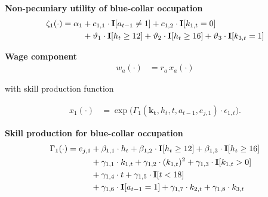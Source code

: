 \begin{frame}\textbf{Non-pecuniary utility of blue-collar occupation}\vspace{0.3cm}
%
  \begin{align*}
  \zeta_{1}(\cdot)  = \alpha_1 & + c_{1,1} \cdot {\textbf{I}}[a_{t-1} \neq 1] + c_{1,2} \cdot {\textbf{I}}[k_{1,t} = 0] \\
                              & + \vartheta_1 \cdot {\textbf{I}}[h_t \geq 12] + \vartheta_2 \cdot {\textbf{I}}[h_t \geq 16] + \vartheta_3 \cdot {\textbf{I}}[k_{3,t} = 1]
  \end{align*}
\end{frame}
\begin{frame}\textbf{Wage component}\vspace{0.3cm}
%
\begin{align*}
w_{a}(\cdot) & = r_{a} \, x_{a}(\cdot)
\end{align*}

with skill production function

\begin{align*}
x_{1}(\cdot) & = \exp \big( \Gamma_{1}(\bm{k_t},  h_t, t, a_{t-1}, e_{j,1}) \cdot \epsilon_{1,t} \big).
\end{align*}
\end{frame}
\begin{frame}\textbf{Skill production for blue-collar occupation}\vspace{0.3cm}
%
\begin{align*}
     \Gamma_1(\cdot) = e_{j,1} & + \beta_{1,1} \cdot h_t + \beta_{1, 2} \cdot {\textbf{I}}[h_t \geq 12] + \beta_{1,3} \cdot {\textbf{I}}[h_t\geq 16]\\
                                   & + \gamma_{1, 1} \cdot  k_{1,t} + \gamma_{1,2} \cdot  (k_{1,t})^2 + \gamma_{1,3} \cdot  {\textbf{I}}[k_{1,t} > 0] \\
                                 & + \gamma_{1,4} \cdot  t + \gamma_{1,5} \cdot {\textbf{I}}[t < 18]\\
                                   & + \gamma_{1,6} \cdot {\textbf{I}}[a_{t-1} = 1] + \gamma_{1,7} \cdot  k_{2,t} + \gamma_{1,8} \cdot  k_{3,t}
\end{align*}
%
\end{frame}
